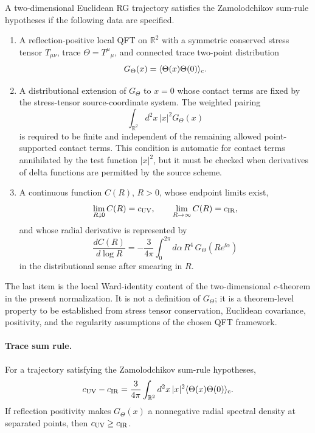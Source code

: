 \begin{definition}
\label{def:zamolodchikov-sum-rule-hypotheses}
A two-dimensional Euclidean RG trajectory satisfies the Zamolodchikov sum-rule hypotheses
if the following data are specified.
\begin{enumerate}
\item A reflection-positive local QFT on \(\mathbb R^2\) with a symmetric
conserved stress tensor \(T_{\mu\nu}\), trace
\(\Theta=T^\mu{}_\mu\), and connected trace two-point distribution
\[
  G_\Theta(x)=
  \langle \Theta(x)\Theta(0)\rangle_{\rm c}.
\]
\item A distributional extension of \(G_\Theta\) to \(x=0\) whose contact
terms are fixed by the stress-tensor source-coordinate system.  The weighted pairing
\[
  \int_{\mathbb R^2} d^2x\, |x|^2 G_\Theta(x)
\]
is required to be finite and independent of the remaining allowed
point-supported contact terms.  This condition is automatic for contact terms
annihilated by the test function \(|x|^2\), but it must be checked when
derivatives of delta functions are permitted by the source scheme.
\item A continuous function \(C(R)\), \(R>0\), whose endpoint limits exist,
\[
  \lim_{R\downarrow0}C(R)=c_{\rm UV},
  \qquad
  \lim_{R\to\infty}C(R)=c_{\rm IR},
\]
and whose radial derivative is represented by
\begin{equation}
  \frac{dC(R)}{d\log R}
  =
  -\frac{3}{4\pi}
  \int_0^{2\pi} d\alpha\,
  R^4\,G_\Theta(R e^{\ii\alpha})
  \label{eq:zamolodchikov-radial-derivative-identity}
\end{equation}
in the distributional sense after smearing in \(R\).
\end{enumerate}
\end{definition}

The last item is the local Ward-identity content of the two-dimensional
\(c\)-theorem in the present normalization.  It is not a definition of
\(G_\Theta\); it is a theorem-level property to be established from stress
tensor conservation, Euclidean covariance, positivity, and the regularity
assumptions of the chosen QFT framework.

\paragraph{Trace sum rule.}
For a trajectory satisfying the Zamolodchikov sum-rule hypotheses,
\begin{equation}
  c_{\rm UV}-c_{\rm IR}
  =
  \frac{3}{4\pi}
  \int_{\mathbb R^2} d^2x\, |x|^2
  \langle \Theta(x)\Theta(0)\rangle_{\rm c}.
  \label{eq:integrable-flow-trace-sum-rule}
\end{equation}
If reflection positivity makes \(G_\Theta(x)\) a nonnegative radial spectral
density at separated points, then \(c_{\rm UV}\geq c_{\rm IR}\).

